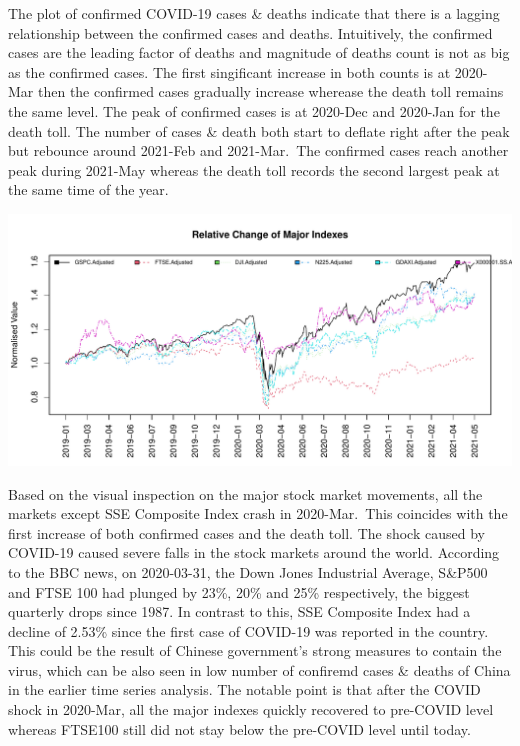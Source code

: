 \documentclass[
  11pt,
]{article}
\begin{document}
The plot of confirmed COVID-19 cases \& deaths indicate that there is a
lagging relationship between the confirmed cases and deaths.
Intuitively, the confirmed cases are the leading factor of deaths and
magnitude of deaths count is not as big as the confirmed cases. The
first singificant increase in both counts is at 2020-Mar then the
confirmed cases gradually increase wherease the death toll remains the
same level. The peak of confirmed cases is at 2020-Dec and 2020-Jan for
the death toll. The number of cases \& death both start to deflate right
after the peak but rebounce around 2021-Feb and 2021-Mar.~The confirmed
cases reach another peak during 2021-May whereas the death toll records
the second largest peak at the same time of the year.

\includegraphics{ST436_Project_files/figure-latex/unnamed-chunk-37-1.pdf}

Based on the visual inspection on the major stock market movements, all
the markets except SSE Composite Index crash in 2020-Mar.~This coincides
with the first increase of both confirmed cases and the death toll. The
shock caused by COVID-19 caused severe falls in the stock markets around
the world. According to the BBC news, on 2020-03-31, the Down Jones
Industrial Average, S\&P500 and FTSE 100 had plunged by 23\%, 20\% and
25\% respectively, the biggest quarterly drops since 1987. In contrast
to this, SSE Composite Index had a decline of 2.53\% since the first
case of COVID-19 was reported in the country. This could be the result
of Chinese government's strong measures to contain the virus, which can
be also seen in low number of confiremd cases \& deaths of China in the
earlier time series analysis. The notable point is that after the COVID
shock in 2020-Mar, all the major indexes quickly recovered to pre-COVID
level whereas FTSE100 still did not stay below the pre-COVID level until
today.
\end{document}
